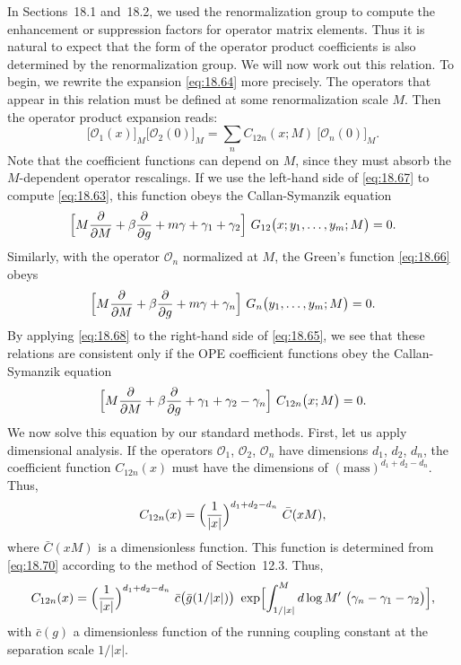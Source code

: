 In Sections~18.1 and~18.2, we used the renormalization group to compute the
enhancement or suppression factors for operator matrix elements.  Thus it is
natural to expect that the form of the operator product coefficients is also
determined by the renormalization group.  We will now work out this relation.
To begin, we rewrite the expansion \eqref{eq:18.64} more precisely.  The
operators that appear in this relation must be defined at some renormalization
scale $M$.  Then the operator product expansion reads:
\begin{equation}
  \bigl[ \mathcal{O}_1(x) \bigr]_M \bigl[ \mathcal{O}_2(0) \bigr]_M
  = \sum_n C_{12n}(x; M)\ \bigl[ \mathcal{O}_n(0) \bigr]_M .
  \label{eq:18.67}
\end{equation}
Note that the coefficient functions can depend on $M$, since they must absorb
the $M$-dependent operator rescalings.  If we use the left-hand side of
\eqref{eq:18.67} to compute \eqref{eq:18.63}, this function obeys the
Callan-Symanzik equation
\begin{equation}
  \Bigl[ M\frac{\partial}{\partial M} + \beta\frac{\partial}{\partial g}
    + m\gamma + \gamma_1 + \gamma_2 \Bigr]\ G_{12}\bigl( x; y_1, \ldots,
      y_m; M \bigr) = 0 .
  \label{eq:18.68}
\end{equation}
Similarly, with the operator $\mathcal{O}_n$ normalized at $M$, the Green's
function \eqref{eq:18.66} obeys
\begin{equation}
  \Bigl[ M\frac{\partial}{\partial M} + \beta\frac{\partial}{\partial g}
    + m\gamma + \gamma_n \Bigr]\ G_n\bigl( y_1, \ldots, y_m; M \bigr) = 0 .
  \label{eq:18.69}
\end{equation}
By applying \eqref{eq:18.68} to the right-hand side of \eqref{eq:18.65}, we
see that these relations are consistent only if the OPE coefficient functions
obey the Callan-Symanzik equation
\begin{equation}
  \Bigl[ M\frac{\partial}{\partial M} + \beta\frac{\partial}{\partial g}
    + \gamma_1 + \gamma_2 - \gamma_n \Bigr]\ C_{12n}\bigl( x; M \bigr) = 0 .
  \label{eq:18.70}
\end{equation}
We now solve this equation by our standard methods.  First, let us apply
dimensional analysis.  If the operators $\mathcal{O}_1$, $\mathcal{O}_2$,
$\mathcal{O}_n$ have dimensions $d_1$, $d_2$, $d_n$, the coefficient function
$C_{12n}(x)$ must have the dimensions of $(\mathrm{mass})^{d_1+d_2-d_n}$.
Thus,
\begin{equation}
  C_{12n}(x) = \Bigl( \frac{1}{|x|} \Bigr)^{d_1+d_2-d_n}\
    \bar{C}(xM) ,
  \label{eq:18.71}
\end{equation}
where $\bar{C}(xM)$ is a dimensionless function.  This function is determined
from \eqref{eq:18.70} according to the method of Section~12.3.  Thus,
\begin{equation}
  C_{12n}(x) = \Bigl( \frac{1}{|x|} \Bigr)^{d_1+d_2-d_n}\ \bar{c}\bigl(
    \bar{g}(1/|x|) \bigr)\ \exp\Bigl[ \int_{1/|x|}^{M} d\log M'\ \bigl(
      \gamma_n - \gamma_1 - \gamma_2 \bigr) \Bigr] ,
  \label{eq:18.72}
\end{equation}
with $\bar{c}(g)$ a dimensionless function of the running coupling constant
at the separation scale $1/|x|$.

